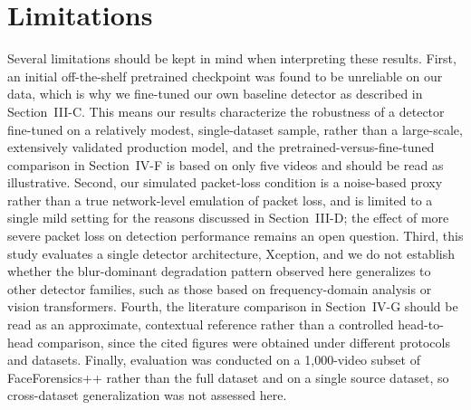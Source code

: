 \documentclass[conference]{IEEEtran}
\begin{document}
\section{Limitations}
Several limitations should be kept in mind when interpreting these results. First, an initial off-the-shelf pretrained checkpoint was found to be unreliable on our data, which is why we fine-tuned our own baseline detector as described in Section~III-C. This means our results characterize the robustness of a detector fine-tuned on a relatively modest, single-dataset sample, rather than a large-scale, extensively validated production model, and the pretrained-versus-fine-tuned comparison in Section~IV-F is based on only five videos and should be read as illustrative. Second, our simulated packet-loss condition is a noise-based proxy rather than a true network-level emulation of packet loss, and is limited to a single mild setting for the reasons discussed in Section~III-D; the effect of more severe packet loss on detection performance remains an open question. Third, this study evaluates a single detector architecture, Xception, and we do not establish whether the blur-dominant degradation pattern observed here generalizes to other detector families, such as those based on frequency-domain analysis or vision transformers. Fourth, the literature comparison in Section~IV-G should be read as an approximate, contextual reference rather than a controlled head-to-head comparison, since the cited figures were obtained under different protocols and datasets. Finally, evaluation was conducted on a 1,000-video subset of FaceForensics++ rather than the full dataset and on a single source dataset, so cross-dataset generalization was not assessed here.
\end{document}
